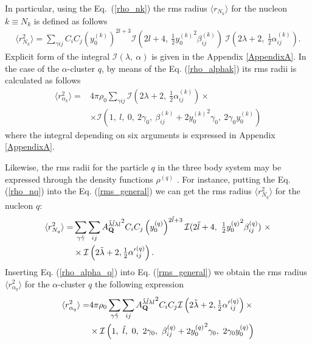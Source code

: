 \documentclass[
12pt, %
oneside, %
english, %
onehalfspacing, %
onehalfspacing, %
headsepline, %
]{MastersDoctoralThesis} %
\begin{document}
In particular, using the Eq.~(\ref{rho_nk}) the rms radius $\langle r_{N_k} \rangle$ for the nucleon $k\equiv N_k$  is defined as follows
\begin{align}
\langle r_{N_k}^2 \rangle =\sum_{\gamma ij} 
C_iC_j  
\left( y_0^{(k)} \right)^{2l+3}
 \mathcal{I}(2l+4, ~\tfrac{1}{2} {y_0^{(k)}}^2 \beta^{(k)}_{ij})~
\mathcal{I}\left( 2\lambda+2, ~\tfrac{1}{2} \alpha_{ij}^{(k)} \right). 
\end{align}
Explicit form of the integral $\mathcal{I} \left( \lambda, ~\alpha\right)$ is given in the Appendix \ref{AppendixA}.
In the case of the $\alpha$-cluster $q$, by means of the Eq. (\ref{rho_alphak}) its rms radii is calculated as follows
\begin{align}
\langle r_{\alpha_k}^2 \rangle =&4 \pi \rho_0
\sum_{\gamma ij} 
 \mathcal{I}\left( 2\lambda+2,~ \tfrac{1}{2} \alpha^{(k)}_{ij}\right) 
 \times \\
 & \times 
 \mathcal{I}\left(1, ~l,~0,~2\gamma_0,~\beta_{ij}^{(k)}+2{y^{(k)}_0}^2 \gamma_0,~2\gamma_0 y^{(k)}_0\right)
 \nonumber
\end{align}
where the integral depending on six arguments is expressed in Appendix \ref{AppendixA}.

Likewise, the rms radii for the particle $q$  in the three body system may be expressed through the density functions $\rho^{(q)}$ . For instance, putting the Eq. (\ref{rho_nq}) into the Eq. (\ref{rms_general}) we can get the rms radius $\langle r_{N_q}^2 \rangle $ for the nucleon $q$:
\begin{align}
\langle r_{N_q}^2 \rangle  = &
\sum_{\gamma \tilde{\gamma}} \sum_{ij} 
{A^{\tilde{\lambda} \tilde{l} \lambda l}_{{\bf Q} }}^2
C_iC_j  
\left( y_0^{(q)} \right)^{2\tilde{l}+3}
 \mathcal{I}(2\tilde{l}+4, ~\tfrac{1}{2} {y_0^{(q)}}^2 \beta^{(q)}_{ij})~
 \times 
\\ \nonumber 
& \times 
\mathcal{I}\left( 2\tilde{\lambda}+2, \tfrac{1}{2} {\alpha'}_{ij}^{(q)} \right).
\end{align}
Inserting Eq. (\ref{rho_alpha_q}) into Eq. (\ref{rms_general}) we obtain the rms radius $\langle r_{\alpha_q}^2 \rangle$  for the $\alpha$-cluster $q$ the following expression 
\begin{align}
\langle r_{\alpha_q}^2 \rangle=&
4 \pi \rho_0
\sum_{\gamma \tilde{\gamma}} \sum_{ij} 
{A^{\tilde{\lambda} \tilde{l} \lambda l}_{{\bf Q} }}^2
  C_i C_j 
 \mathcal{I}\left( 2\tilde{\lambda}+2, \tfrac{1}{2} {\alpha'}^{(q)}_{ij}\right) \times \\
 & \times \mathcal{I}\left(1, ~\tilde{l},~0,~2\gamma_0,~\beta_{ij}^{(q)}+2{y^{(q)}_0}^2 \gamma_0,~2\gamma_0 y^{(q)}_0\right)
 \nonumber
\end{align}
\end{document}
